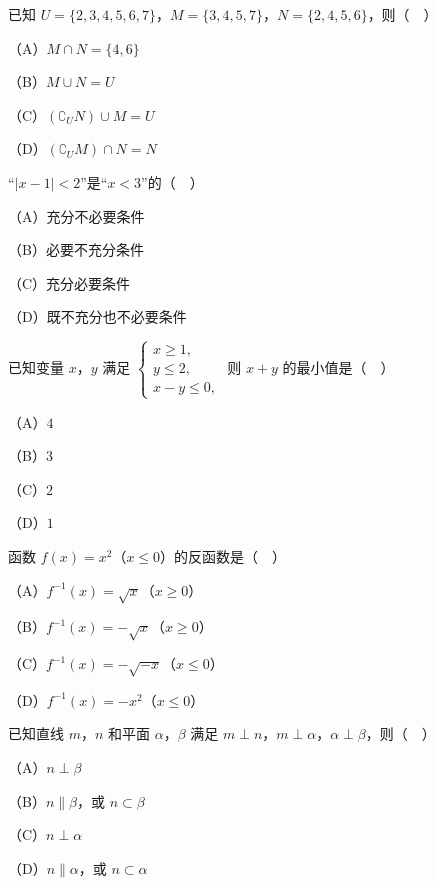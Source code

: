 


\begin{question}
已知 $U=\{2,3,4,5,6,7\}$，$M=\{3,4,5,7\}$，$N=\{2,4,5,6\}$，则（　）

（A）$M\cap N=\{4,6\}$

（B）$M\cup N=U$

（C）$(\complement_UN)\cup M=U$

（D）$(\complement_UM)\cap N=N$

\end{question}
\begin{question}
“$|x-1|<2$”是“$x<3$”的（　）

（A）充分不必要条件

（B）必要不充分条件

（C）充分必要条件

（D）既不充分也不必要条件

\end{question}
\begin{question}
已知变量 $x$，$y$ 满足 $\begin{cases}x\geqslant1,\\ y\leqslant2,\\ x-y\leqslant0,\end{cases}$ 则 $x+y$ 的最小值是（　）

（A）$4$

（B）$3$

（C）$2$

（D）$1$

\end{question}
\begin{question}
函数 $f(x)=x^2$（$x\leqslant0$）的反函数是（　）

（A）$f^{-1}(x)=\sqrt x$（$x\geqslant0$）

（B）$f^{-1}(x)=-\sqrt x$（$x\geqslant0$）

（C）$f^{-1}(x)=-\sqrt{-x}$（$x\leqslant0$）

（D）$f^{-1}(x)=-x^2$（$x\leqslant0$）

\end{question}
\begin{question}
已知直线 $m$，$n$ 和平面 $\alpha$，$\beta$ 满足 $m\perp n$，$m\perp\alpha$，$\alpha\perp\beta$，则（　）

（A）$n\perp\beta$

（B）$n\parallel\beta$，或 $n\subset\beta$

（C）$n\perp\alpha$

（D）$n\parallel\alpha$，或 $n\subset\alpha$

\end{question}
